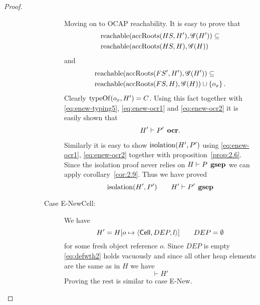 \begin{proof}
\begin{description}
\begin{description}
\begin{description}
              Moving on to OCAP reachability. It is easy to prove that
              \begin{equation} \label{eq:enew-ocr1}
                \begin{aligned}
                  &\mbox{$\mathrm{reachable}$}(\mbox{$\mathrm{accRoots}$}(HS, H'), \mathscr{G}(H')) \subseteq \\
                  &\mbox{$\mathrm{reachable}$}(\mbox{$\mathrm{accRoots}$}(HS, H), \mathscr{G}(H)) 
                \end{aligned}
              \end{equation}
              and
              \begin{equation} \label{eq:enew-ocr2}
                \begin{aligned}
                  &\mbox{$\mathrm{reachable}$}(\mbox{$\mathrm{accRoots}$}(FS', H'), \mathscr{G}(H')) \subseteq \\
                  &\mbox{$\mathrm{reachable}$}(\mbox{$\mathrm{accRoots}$}(FS, H), \mathscr{G}(H)) \cup \left\{ o_x
                  \right\}.
                \end{aligned}
              \end{equation}
              Clearly $\mbox{$\mathrm{typeOf}$}(o_x, H') = C$. Using this fact together with
              \eqref{eq:enew-typing5}, \eqref{eq:enew-ocr1} and
              \eqref{eq:enew-ocr2} it is easily shown that
              \begin{equation}
                H' \vdash P' \:\: \mbox{\bf ocr}.
              \end{equation}

              Similarly it is easy to show $\mbox{$\mathrm{isolation}$}(H', P')$ using
              \eqref{eq:enew-ocr1}, \eqref{eq:enew-ocr2} together with
              proposition~\ref{prop:2.6}. Since the isolation proof never relies
              on $H \vdash P \:\: \mbox{\bf gsep}$ we can apply
              corollary~\ref{cor:2.9}. Thus we have proved
              \begin{equation}
                \mbox{$\mathrm{isolation}$}(H', P') \quad\quad H' \vdash P' \:\: \mbox{\bf gsep}
              \end{equation}

            \item[Case {\sc E-NewCell}:] We have
              \begin{equation}
                H' = H[o \mapsto \mbox{$\langle \mbox{$\mathsf{Cell}$}{}, DEP, l \rangle$}] \quad\quad DEP = \emptyset
              \end{equation}
              for some fresh object reference $o$. 
              Since $DEP$ is empty \eqref{eq:defwth2} holds vacuously and since
              all other heap elements are the same as in $H$ we have
              \begin{equation}
                \vdash H'
              \end{equation}
              Proving the rest is similar to case {\sc E-New}.


\end{description}
\end{description}
\end{description}
\end{proof}
